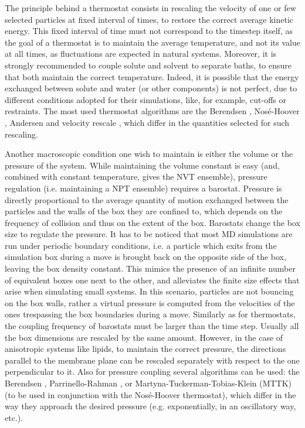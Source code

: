The principle behind a thermostat consists in rescaling the velocity of one or few selected particles at fixed interval of times, to restore the correct average kinetic energy. This fixed interval of time must not correspond to the timestep itself, as the goal of a thermostat is to maintain the average temperature, and not its value at all times, as fluctuations are expected in natural systems.
%
Moreover, it is strongly recommended to couple solute and solvent to separate baths, to ensure that both maintain the correct temperature. Indeed, it is possible that the energy exchanged between solute and water (or other components) is not perfect, due to different conditions adopted for their simulations, like, for example, cut-offs or restraints.
%
The most used thermostat algorithms are the Berendsen \cite{Berendsen1984}, Nos\'{e}-Hoover \cite{Nose1983,Hoover1985}, Andersen \cite{Andersen1980} and velocity rescale \cite{Bussi2007}, which differ in the quantities selected for such rescaling.

Another macroscopic condition one wish to maintain is either the volume or the pressure of the system. While maintaining the volume constant is easy (and, combined with constant temperature, gives the NVT ensemble), pressure regulation (i.e. maintaining a NPT ensemble) requires a barostat.
%
Pressure is directly proportional to the average quantity of motion exchanged between the particles and the walls of the box they are confined to, which depends on the frequency of collision and thus on the extent of the box. Barostats change the box size to regulate the pressure.
%
It has to be noticed that most MD simulations are run under periodic boundary conditions, i.e. a particle which exits from the simulation box during a move is brought back on the opposite side of the box, leaving the box density constant. This mimics the presence of an infinite number of equivalent boxes one next to the other, and alleviates the finite size effects that arise when simulating small systems.
%
In this scenario, particles are not bouncing on the box walls, rather a virtual pressure is computed from the velocities of the ones trespassing the box boundaries during a move.
%
Similarly as for thermostats, the coupling frequency of barostats must be larger than the time step. Usually all the box dimensions are rescaled by the same amount. However, in the case of anisotropic systems like lipids, to maintain the correct pressure, the directions parallel to the membrane plane can be rescaled separately with respect to the one perpendicular to it.
%
Also for pressure coupling several algorithms can be used: the Berendsen \cite{Berendsen1984}, Parrinello-Rahman \cite{Parrinello1981}, or Martyna-Tuckerman-Tobias-Klein (MTTK) \cite{Martyna1996} (to be used in conjunction with the Nos\'{e}-Hoover thermostat), which differ in the way they approach the desired pressure (e.g. exponentially, in an oscillatory way, etc.).


